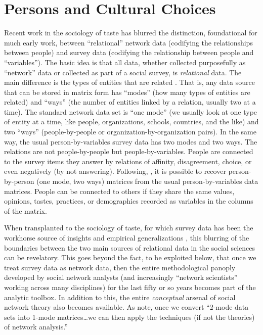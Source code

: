 \documentclass[a4paper,12pt]{extarticle}
\begin{document}
\section{Persons and Cultural Choices}
Recent work in the sociology of taste has blurred the distinction, foundational for much early work, between ``relational'' network data (codifying the relationships between people) and survey data (codifying the relationship between people and ``variables''). The basic idea is that all data, whether collected purposefully as ``network'' data or collected as part of a social survey, is \textit{relational} data. The main difference is the types of entities that are related \citep{borgatti_everett97}. That is, any data source that can be stored in matrix form has ``modes'' (how many types of entities are related) and ``ways'' (the number of entities linked by a relation, usually two at a time). The standard network data set is ``one mode'' (we usually look at one type of entity at a time, like people, organizations, schools, countries, and the like) and two ``ways'' (people-by-people or organization-by-organization pairs). In the same way, the usual person-by-variables survey data has two modes and two ways. The relations are not people-by-people but people-by-variables. People are connected to the survey items they answer by relations of affinity, disagreement, choice, or even negatively (by not answering). Following, \citet{breiger74}, it is possible to recover person-by-person (one mode, two ways) matrices from the usual person-by-variables data matrices. People can be connected to others if they share the same values, opinions, tastes, practices, or demographics recorded as variables in the columns of the matrix. 

When transplanted to the sociology of taste, for which survey data has been the workhorse source of insights and empirical generalizations \citep{peterson_kern96, bryson96, vaneijck01,savage_gayo11}, this blurring of the boundaries between the two main sources of relational data in the social sciences can be revelatory. This goes beyond the fact, to be exploited below, that once we treat survey data as network data, then the entire methodological panoply developed by social network analysts (and increasingly ``network scientists'' working across many disciplines) for the last fifty or so years becomes part of the analytic toolbox. In addition to this, the entire \textit{conceptual} arsenal of social network theory \citep{borgatti11} also becomes available. As \citet[244]{borgatti_everett97} note, once we convert ``2-mode data sets into 1-mode matrices{\dots}we can then apply the techniques (if not the theories) of network analysis.''
\end{document}
